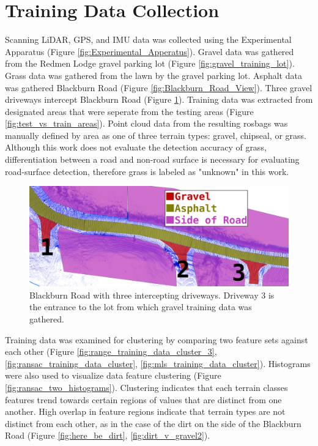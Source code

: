 \documentclass[numbered,pdftex]{ohio-etd}
\begin{document}
{{	\section{Training Data Collection}\label{sec:training-data-collection}{
	
		{Scanning LiDAR, GPS, and IMU data was collected using the Experimental Apparatus (Figure \ref{fig:Experimental_Apperatus}). Gravel data was gathered from the Redmen Lodge gravel parking lot (Figure \ref{fig:gravel_training_lot}). Grass data was gathered from the lawn by the gravel parking lot. Asphalt data was gathered Blackburn Road (Figure \ref{fig:Blackburn_Road_View}). Three gravel driveways intercept Blackburn Road (Figure \ref{fig:road_areas_annotated_2}). Training data was extracted from designated areas that were seperate from the testing areas (Figure \ref{fig:test_vs_train_areas}). Point cloud data from the resulting rosbags was manually defined by area as one of three terrain types: gravel, chipseal, or grass. Although this work does not evaluate the detection accuracy of grass, differentiation between a road and non-road surface is necessary for evaluating road-surface detection, therefore grass is labeled as "unknown" in this work.} 
		
		
		
		\begin{figure}[H]
			\centering
			\includegraphics[width=0.65\linewidth]{Defense_Images/road_areas_annotated_2}
			\caption[Blackburn Road Overlays]{Blackburn Road with three intercepting driveways. Driveway $3$ is the entrance to the lot from which gravel training data was gathered. }
			\label{fig:road_areas_annotated_2}
		\end{figure}

		{Training data was examined for clustering by comparing two feature sets against each other (Figure \ref{fig:range_training_data_cluster_3}, \ref{fig:ransac_training_data_cluster}, \ref{fig:mls_training_data_cluster}). Histograms were also used to visualize data feature clustering (Figure \ref{fig:ransac_two_histograms}). Clustering indicates that each terrain classes features trend towards certain regions of values that are distinct from one another. High overlap in feature regions indicate that terrain types are not distinct from each other, as in the case of the dirt on the side of the Blackburn Road (Figure \ref{fig:here_be_dirt}, \ref{fig:dirt_v_gravel2}). }
		
}}}
\end{document}
